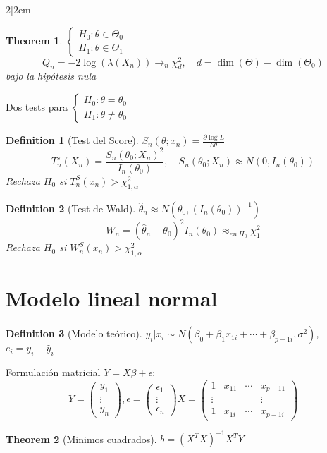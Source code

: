 \documentclass[leqno]{article}
\newtheorem*{theorem}{Theorem}
\newtheorem*{definition}{Definition}
\begin{document}
\begin{multicols}{2}[\columnsep2em]
\begin{theorem} $\begin{cases}
  H_0: \theta \in \Theta_0\\
  H_1:\theta \in \Theta_1
\end{cases}$ 
\[
Q_n = -2\log (\lambda(X_n)) \to _n \chi ^2_d, \quad d=\dim (\Theta)-\dim(\Theta_0)
\] 
bajo la hipótesis nula
\end{theorem}

Dos tests para $\begin{cases}
  H_0:\theta =\theta _0\\ H_1: \theta \neq \theta _0
\end{cases}$

\begin{definition}[Test del Score] $S_n(\theta ;x_n) = \frac{\partial \log L}{\partial \theta }$
\[
T_n^s(X_n) = \frac{S_n(\theta _0;X_n)^2}{I_n(\theta _0)}, \quad S_n(\theta _0;X_n) \approx N(0,I_n(\theta _0))
\] 
Rechaza $H_0$ si  $T_n^S(x_n)>\chi ^2_{1,\alpha} $
\end{definition}

\begin{definition}[Test de Wald] $\hat{\theta }_n \approx N(\theta _0, (I_n(\theta _0))^{-1})$
\[
W_n = (\hat{\theta }_n-\theta _0)^2I_n(\theta _0) \approx_{en \ H_0} \chi ^2_1
\] 
Rechaza $H_0$ si  $W_n^S(x_n)>\chi ^2_{1,\alpha} $
\end{definition}





\section{Modelo lineal normal}

\begin{definition}[Modelo teórico] $y_i|x_i \sim N(\beta _0+ \beta_1x_{1i}+ \cdots + \beta_{p-1i}, \sigma ^2)$, $e_i = y_i-\hat{y}_i$
\end{definition}

Formulación matricial $Y = X\beta + \epsilon$:
\[
Y = \begin{pmatrix} y_1 \\ \vdots \\ y_n \end{pmatrix} , \epsilon = \begin{pmatrix} \epsilon_1\\ \vdots \\ \epsilon_n \end{pmatrix} 
X = \begin{pmatrix} 1 & x_{11} & \cdots & x_{p-11} \\ \vdots & & & \vdots \\ 1 & x_{1i} & \cdots & x_{p-1i} \end{pmatrix} 
\] 
\begin{theorem}[Minimos cuadrados] $ b = (X^TX)^{-1}X^TY$
\end{theorem}


\end{multicols}
\end{document}

